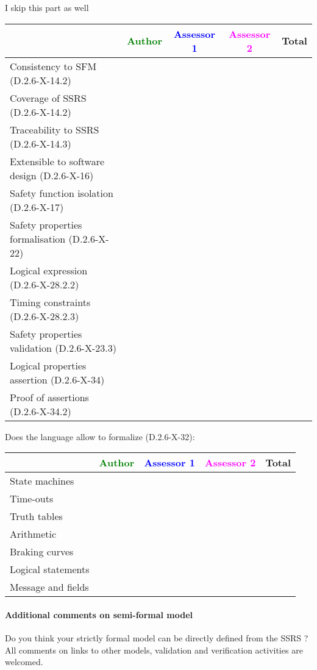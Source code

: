 \begin{assessor1}
I skip this part as well
\end{assessor1}

\begin{tabular}{|l | c | c | c | c|}
\hline
& \textcolor{green}{Author} & \textcolor{blue}{Assessor 1} & \textcolor{magenta}{Assessor 2} & Total \\
\hline 
Consistency to SFM (D.2.6-X-14.2) & & & &  \\
\hline
Coverage of SSRS (D.2.6-X-14.2)  & & & &  \\
\hline
Traceability to  SSRS (D.2.6-X-14.3)  & & & &  \\
\hline
Extensible to software design (D.2.6-X-16)  & & & &  \\
\hline
Safety function isolation (D.2.6-X-17)  & & & &  \\
\hline 
Safety properties formalisation (D.2.6-X-22)  & & & &  \\
\hline
Logical expression (D.2.6-X-28.2.2)  & & & &  \\
\hline
Timing constraints (D.2.6-X-28.2.3)  & & & &  \\
\hline
Safety properties validation (D.2.6-X-23.3)  & & & &  \\
\hline
Logical properties assertion (D.2.6-X-34)  & & & &  \\
\hline
Proof of assertions (D.2.6-X-34.2)  & & & &  \\
\hline
\end{tabular}

Does the language allow to  formalize (D.2.6-X-32):

\begin{tabular}{|l | c | c | c | c|}
\hline
& \textcolor{green}{Author} & \textcolor{blue}{Assessor 1} & \textcolor{magenta}{Assessor 2} & Total \\
\hline 
State machines  & & & &  \\
\hline
Time-outs  & & & &  \\
\hline
Truth tables  & & & &  \\
\hline
Arithmetic  & & & &  \\
\hline
Braking curves  & & & &  \\
\hline
Logical statements & & & &  \\
\hline
Message and fields & & & &  \\
\hline
\end{tabular}

\paragraph{Additional comments on semi-formal  model} Do you think your strictly formal  model can be directly defined from the SSRS ?
All comments on links to  other models, validation and verification activities are welcomed.


